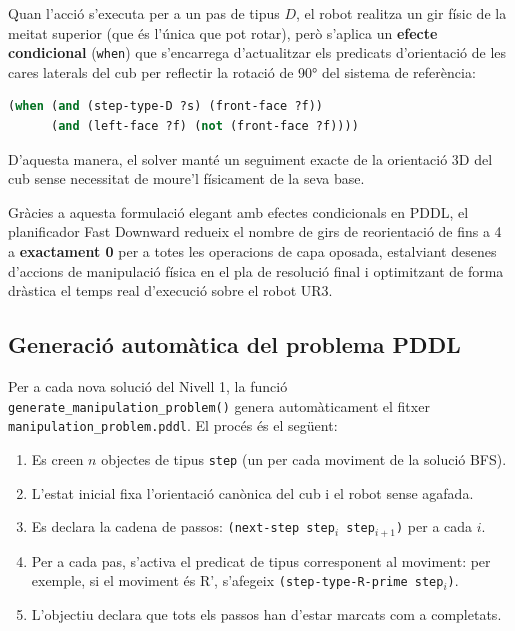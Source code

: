 \documentclass[12pt, a4paper]{article}
\begin{document}
\begin{itemize}[leftmargin=1.5em]
  Quan l'acció s'executa per a un pas de tipus $D$, el robot realitza un gir físic de la meitat superior (que és l'única que pot rotar), però s'aplica un \textbf{efecte condicional} (\texttt{when}) que s'encarrega d'actualitzar els predicats d'orientació de les cares laterals del cub per reflectir la rotació de 90° del sistema de referència:
  \begin{lstlisting}[language=Lisp, basicstyle=\ttfamily\scriptsize]
(when (and (step-type-D ?s) (front-face ?f)) 
      (and (left-face ?f) (not (front-face ?f))))
  \end{lstlisting}
  D'aquesta manera, el solver manté un seguiment exacte de la orientació 3D del cub sense necessitat de moure'l físicament de la seva base.
\end{itemize}

Gràcies a aquesta formulació elegant amb efectes condicionals en PDDL, el planificador Fast Downward redueix el nombre de girs de reorientació de fins a 4 a \textbf{exactament 0} per a totes les operacions de capa oposada, estalviant desenes d'accions de manipulació física en el pla de resolució final i optimitzant de forma dràstica el temps real d'execució sobre el robot UR3.

\subsection{Generació automàtica del problema PDDL}

Per a cada nova solució del Nivell 1, la funció \texttt{generate\_manipulation\_problem()} genera automàticament el fitxer \texttt{manipulation\_problem.pddl}. El procés és el següent:

\begin{enumerate}
  \item Es creen $n$ objectes de tipus \texttt{step} (un per cada moviment de la solució BFS).
  \item L'estat inicial fixa l'orientació canònica del cub i el robot sense agafada.
  \item Es declara la cadena de passos: \texttt{(next-step step$_i$ step$_{i+1}$)} per a cada $i$.
  \item Per a cada pas, s'activa el predicat de tipus corresponent al moviment: per exemple, si el moviment és R', s'afegeix \texttt{(step-type-R-prime step$_i$)}.
  \item L'objectiu declara que tots els passos han d'estar marcats com a completats.
\end{enumerate}
\end{document}

